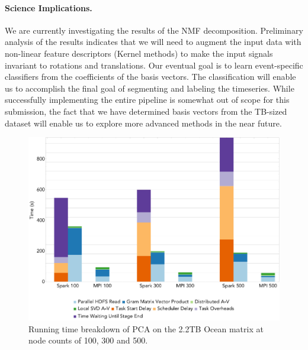 \paragraph{Science Implications.}
We are currently investigating the results of the NMF decomposition. Preliminary analysis of the results indicates that we will need to augment the input data with non-linear feature descriptors (Kernel methods) to make the input signals invariant to rotations and translations. Our eventual goal is to learn event-specific classifiers from the coefficients of the basis vectors. The classification will enable us to accomplish the final goal of segmenting and labeling the timeseries. While successfully implementing the entire pipeline is somewhat out of scope for this submission, the fact that we have determined basis vectors from the TB-sized dataset will enable us to explore more advanced methods in the near future.

\begin{figure}[th!]
\centering
\includegraphics[width=\textwidth]{fig/ocean_pca_times.png}
\caption{Running time breakdown of PCA on the 2.2TB Ocean matrix at node counts of 100, 300 and 500.}
\label{fig:pcart}
\end{figure}

